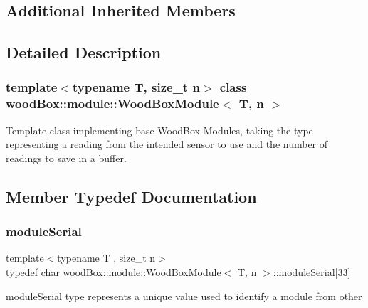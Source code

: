 \subsection*{Additional Inherited Members}


\subsection{Detailed Description}
\subsubsection*{template$<$typename T, size\+\_\+t n$>$\newline
class wood\+Box\+::module\+::\+Wood\+Box\+Module$<$ T, n $>$}

Template class implementing base Wood\+Box Modules, taking the type representing a reading from the intended sensor to use and the number of readings to save in a buffer. 

\subsection{Member Typedef Documentation}
\mbox{\label{classwood_box_1_1module_1_1_wood_box_module_a3a6503bbd5147a06ba50081f97177b46}} 
\subsubsection{\texorpdfstring{module\+Serial}{moduleSerial}}
{\footnotesize\ttfamily template$<$typename T , size\+\_\+t n$>$ \\
typedef char \mbox{\hyperlink{classwood_box_1_1module_1_1_wood_box_module}{wood\+Box\+::module\+::\+Wood\+Box\+Module}}$<$ T, n $>$\+::module\+Serial\mbox{[}33\mbox{]}}

{\ttfamily module\+Serial} type represents a unique value used to identify a module from other \mbox{\label{classwood_box_1_1module_1_1_wood_box_module_adf5d59bae2980ff138284d0fa885df19}} 
